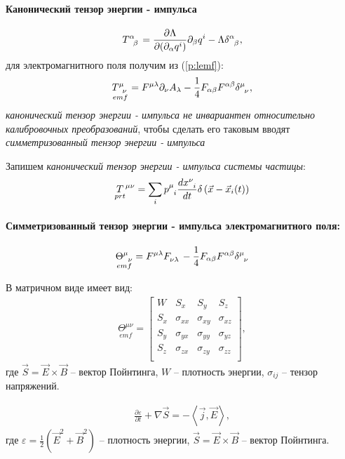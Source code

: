 \documentclass[__minimum__.tex]{subfiles}
\begin{document}
\paragraph{Канонический тензор энергии - импульса}
\begin{gather}
    T\indices{^\alpha_\beta}
    =
    \frac{\partial\Lambda}{\partial(\partial_\alpha{q^i})}\partial_\beta{q^i}
    -
    \Lambda\delta\indices{^\alpha_\beta},
\end{gather}
для электромагнитного поля получим из (\ref{p:lemf}):
\begin{gather}
    \underset{emf}{T\indices{^\mu_\nu}}
    =
    F^{\mu\lambda}\partial_{\nu}A_{\lambda}
    -
    \frac{1}{4}F_{\alpha\beta}F^{\alpha\beta}\delta\indices{^\mu_\nu},
\end{gather}
\emph{канонический тензор энергии - импульса не инвариантен относительно калибровочных преобразований}, чтобы сделать его таковым вводят \emph{симметризованный тензор энергии - импульса}


Запишем \emph{канонический тензор энергии - импульса системы частицы}:
\begin{gather}
    \underset{prt}{T}^{\mu\nu}
    =
    \sum_{i}
    p\indices{^\mu_i}\frac{dx\indices{^\nu_i}}{dt}\delta\left(\vec{x}-\vec{x}_i(t)\right)
\end{gather}

\paragraph{Симметризованный тензор энергии - импульса электромагнитного поля:}
\begin{gather}
    \underset{emf}{\Theta\indices{^\mu_\nu}}
    =
    F^{\mu\lambda}F\indices{_\nu_\lambda}
    -
    \frac{1}{4}F_{\alpha\beta}F^{\alpha\beta}\delta\indices{^\mu_\nu}
\end{gather}

В матричном виде имеет вид:
\begin{gather*}
    \underset{emf}{\Theta^{\mu\nu}} =
    \left[
        \begin{array}{cccc}
            W   & S_x         & S_y         & S_z         \\
            S_x & \sigma_{xx} & \sigma_{xy} & \sigma_{xz} \\
            S_y & \sigma_{yx} & \sigma_{yy} & \sigma_{yz} \\
            S_z & \sigma_{zx} & \sigma_{zy} & \sigma_{zz} \\
        \end{array}
        \right],
\end{gather*}
где $\vec{S}=\vec{E}\times\vec{B}$ -- вектор Пойнтинга, $W$ -- плотность энергии, $\sigma_{ij}$ -- тензор напряжений.

\begin{theorem}
    \begin{gather}
        \frac{\partial\varepsilon}{\partial{t}}+\nabla\vec{S}=-\left<\vec{j},\vec{E}\right>,
    \end{gather}
    где $\varepsilon=\frac{1}{2}\left(\vec{E}^2+\vec{B}^2\right)$ -- плотность энергии, $\vec{S}=\vec{E}\times\vec{B}$ -- вектор Пойнтинга.
\end{theorem}
\end{document}
